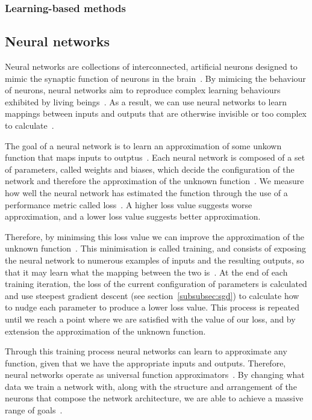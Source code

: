 \subsubsection{Learning-based methods}

\subsection{Neural networks}\label{subsec:neural_networks}
Neural networks are collections of interconnected, artificial neurons designed to mimic the synaptic function of neurons in the brain~\cite{ref}. By mimicing the behaviour of neurons, neural networks aim to reproduce complex learning behaviours exhibited by living beings~\cite{ref}. As a result, we can use neural networks to learn mappings between inputs and outputs that are otherwise invisible or too complex to calculate~\cite{ref}.

The goal of a neural network is to learn an approximation of some unkown function that maps inputs to outptus~\cite{ref}. Each neural network is composed of a set of parameters, called weights and biases, which decide the configuration of the network and therefore the approximation of the unknown function~\cite{ref}. We measure how well the neural network has estimated the function through the use of a performance metric called loss~\cite{ref}. A higher loss value suggests worse approximation, and a lower loss value suggests better approximation.

Therefore, by minimsing this loss value we can improve the approximation of the unknown function~\cite{ref}. This minimisation is called training, and consists of exposing the neural network to numerous examples of inputs and the resulting outputs, so that it may learn what the mapping between the two is~\cite{ref}. At the end of each training iteration, the loss of the current configuration of parameters is calculated and use steepest gradient descent (see section~\ref{subsubsec:sgd}) to calculate how to nudge each parameter to produce a lower loss value. This process is repeated until we reach a point where we are satisfied with the value of our loss, and by extension the approximation of the unknown function.

Through this training process neural networks can learn to approximate any function, given that we have the appropriate inputs and outputs. Therefore, neural networks operate as universal function approximators~\cite{ref}. By changing what data we train a network with, along with the structure and arrangement of the neurons that compose the network architecture, we are able to achieve a massive range of goals~\cite{ref}.

